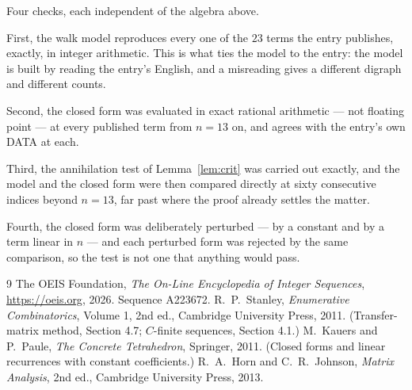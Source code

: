 \documentclass[11pt,a4paper]{article}
\theoremstyle{plain}
\theoremstyle{definition}
\begin{document}
Four checks, each independent of the algebra above.

First, the walk model reproduces every one of the $23$ terms the entry publishes,
exactly, in integer arithmetic. This is what ties the model to the entry: the model is built
by reading the entry's English, and a misreading gives a different digraph and different
counts.

Second, the closed form was evaluated in exact rational arithmetic --- not floating point ---
at every published term from $n=13$ on, and agrees with the entry's own DATA at each.

Third, the annihilation test of Lemma~\ref{lem:crit} was carried out exactly, and the model
and the closed form were then compared directly at sixty consecutive indices beyond
$n=13$, far past where the proof already settles the matter.

Fourth, the closed form was deliberately perturbed --- by a constant and by a term linear in
$n$ --- and each perturbed form was rejected by the same comparison, so the test is not one
that anything would pass.

\begin{thebibliography}{9}
 The OEIS Foundation, \emph{The On-Line Encyclopedia of Integer
Sequences}, \url{https://oeis.org}, 2026. Sequence A223672.
 R.~P.~Stanley, \emph{Enumerative Combinatorics}, Volume 1, 2nd ed.,
Cambridge University Press, 2011. (Transfer-matrix method, Section 4.7; $C$-finite sequences,
Section 4.1.)
 M.~Kauers and P.~Paule, \emph{The Concrete Tetrahedron}, Springer, 2011.
(Closed forms and linear recurrences with constant coefficients.)
 R.~A.~Horn and C.~R.~Johnson, \emph{Matrix Analysis}, 2nd ed., Cambridge
University Press, 2013.
\end{thebibliography}
\end{document}
